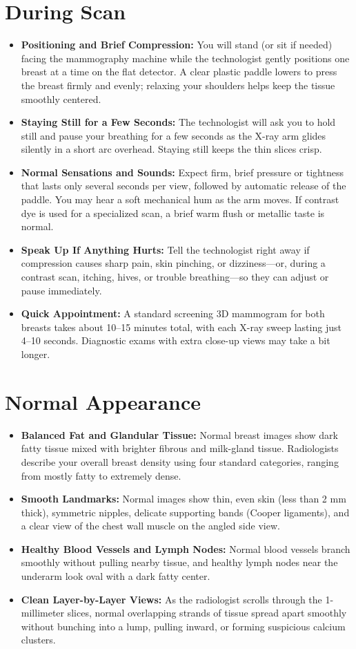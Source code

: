 \section{During Scan}
\begin{itemize}
\item \textbf{Positioning and Brief Compression:} You will stand (or sit if needed) facing the mammography machine while the technologist gently positions one breast at a time on the flat detector. A clear plastic paddle lowers to press the breast firmly and evenly; relaxing your shoulders helps keep the tissue smoothly centered.
\item \textbf{Staying Still for a Few Seconds:} The technologist will ask you to hold still and pause your breathing for a few seconds as the X-ray arm glides silently in a short arc overhead. Staying still keeps the thin slices crisp.
\item \textbf{Normal Sensations and Sounds:} Expect firm, brief pressure or tightness that lasts only several seconds per view, followed by automatic release of the paddle. You may hear a soft mechanical hum as the arm moves. If contrast dye is used for a specialized scan, a brief warm flush or metallic taste is normal.
\item \textbf{Speak Up If Anything Hurts:} Tell the technologist right away if compression causes sharp pain, skin pinching, or dizziness---or, during a contrast scan, itching, hives, or trouble breathing---so they can adjust or pause immediately.
\item \textbf{Quick Appointment:} A standard screening 3D mammogram for both breasts takes about 10--15 minutes total, with each X-ray sweep lasting just 4--10 seconds. Diagnostic exams with extra close-up views may take a bit longer.
\end{itemize}

\section{Normal Appearance}
\begin{itemize}
\item \textbf{Balanced Fat and Glandular Tissue:} Normal breast images show dark fatty tissue mixed with brighter fibrous and milk-gland tissue. Radiologists describe your overall breast density using four standard categories, ranging from mostly fatty to extremely dense.
\item \textbf{Smooth Landmarks:} Normal images show thin, even skin (less than 2 mm thick), symmetric nipples, delicate supporting bands (Cooper ligaments), and a clear view of the chest wall muscle on the angled side view.
\item \textbf{Healthy Blood Vessels and Lymph Nodes:} Normal blood vessels branch smoothly without pulling nearby tissue, and healthy lymph nodes near the underarm look oval with a dark fatty center.
\item \textbf{Clean Layer-by-Layer Views:} As the radiologist scrolls through the 1-millimeter slices, normal overlapping strands of tissue spread apart smoothly without bunching into a lump, pulling inward, or forming suspicious calcium clusters.
\end{itemize}

